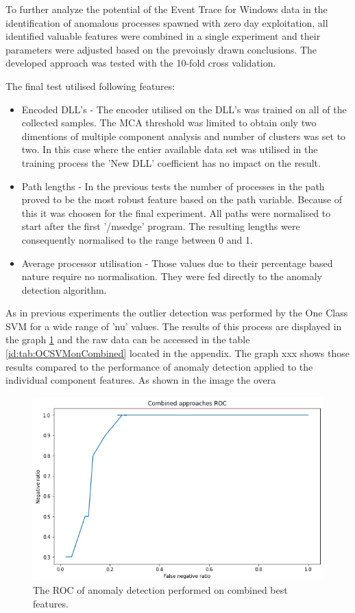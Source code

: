 \documentclass[a4paper,twoside,12pt]{book}
\begin{document}
To further analyze the potential of the Event Trace for Windows data in the identification of
anomalous processes spawned with zero day exploitation, all identified valuable features were
combined in a single experiment and their parameters were adjusted based on the prevoiusly drawn 
conclusions. The developed approach was tested with the 10-fold cross validation.

The final test utilised following features:
\begin{itemize}
	\item Encoded DLL's - The encoder utilised on the DLL's was trained on all of the collected samples. The MCA 
	threshold was limited to obtain only two dimentions of multiple component analysis and number of clusters was set 
	to two. In this case where the entier available data set was utilised in the training process the 'New DLL'
	coefficient has no impact on the result.  
	\item Path lengths - In the previous tests the number of processes in the path proved to be the most robust feature
	based on the path variable. Because of this it was choosen for the final experiment. All paths were normalised to start
	after the first '/msedge' program. The resulting lengths were consequently normalised to the range between 0 and 1.
	\item Average processor utilisation - Those values due to their percentage based nature require no normalisation. They 
	were fed directly to the anomaly detection algorithm. 
\end{itemize}

As in previous experiments the outlier detection was performed by the One Class SVM for a wide range of 'nu' values. The results of 
this process are displayed in the graph \ref{fig:combinedFinalROC} and the raw data can be accessed in the table 
\ref{id:tab:OCSVMonCombined} located in the appendix. The graph xxx shows those results compared to the performance
of anomaly detection applied to the individual component features. As shown in the image the overa 

\begin{figure}
	\centering
	\includegraphics[scale=0.9]{images/CombinedFinalROC}
	\caption{The ROC of anomaly detection performed on combined best features.}
	\label{fig:combinedFinalROC}
 \end{figure}
\end{document}
